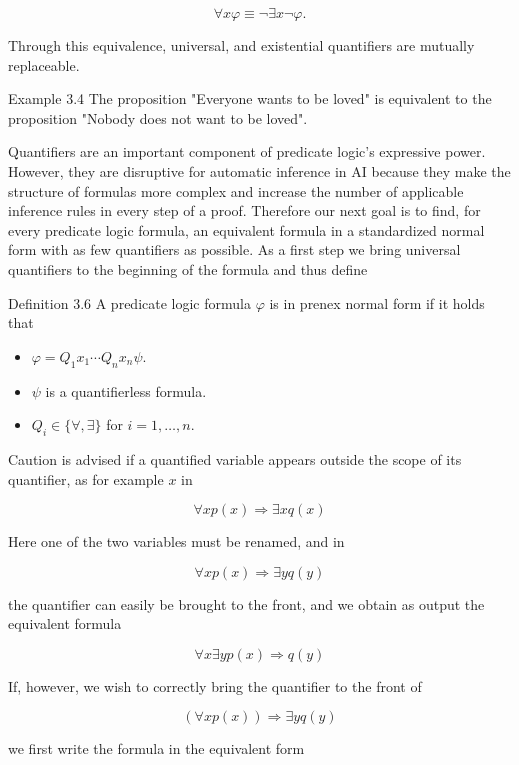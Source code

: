 \documentclass[10pt]{article}
\begin{document}
$$
\forall x \varphi \equiv \neg \exists x \neg \varphi .
$$

Through this equivalence, universal, and existential quantifiers are mutually replaceable.

Example 3.4 The proposition "Everyone wants to be loved" is equivalent to the proposition "Nobody does not want to be loved".

Quantifiers are an important component of predicate logic's expressive power. However, they are disruptive for automatic inference in AI because they make the structure of formulas more complex and increase the number of applicable inference rules in every step of a proof. Therefore our next goal is to find, for every predicate logic formula, an equivalent formula in a standardized normal form with as few quantifiers as possible. As a first step we bring universal quantifiers to the beginning of the formula and thus define

Definition 3.6 A predicate logic formula $\varphi$ is in prenex normal form if it holds that

\begin{itemize}
  \item $\varphi=Q_{1} x_{1} \cdots Q_{n} x_{n} \psi$.
  \item $\psi$ is a quantifierless formula.
  \item $Q_{i} \in\{\forall, \exists\}$ for $i=1, \ldots, n$.
\end{itemize}

Caution is advised if a quantified variable appears outside the scope of its quantifier, as for example $x$ in

$$
\forall x p(x) \Rightarrow \exists x q(x)
$$

Here one of the two variables must be renamed, and in

$$
\forall x p(x) \Rightarrow \exists y q(y)
$$

the quantifier can easily be brought to the front, and we obtain as output the equivalent formula

$$
\forall x \exists y p(x) \Rightarrow q(y)
$$

If, however, we wish to correctly bring the quantifier to the front of


\begin{equation*}
(\forall x p(x)) \Rightarrow \exists y q(y) \tag{3.4}
\end{equation*}


we first write the formula in the equivalent form
\end{document}
